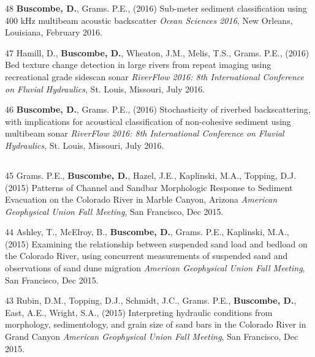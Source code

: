 \documentclass[margin,line]{resume}
\begin{document}
\begin{resume}
\begin{footnotesize}
\begin{list1}
        \item[48]{\bf Buscombe, D.}, Grams. P.E., (2016) Sub-meter sediment classification using 400 kHz multibeam acoustic backscatter {\sl Ocean Sciences 2016}, New Orleans, Louisiana, February 2016.\\
        
        \item[47] Hamill, D., {\bf Buscombe, D.}, Wheaton, J.M., Melis, T.S., Grams. P.E., (2016) Bed texture change detection in large rivers from repeat imaging using recreational grade sidescan sonar {\sl RiverFlow 2016: 8th International Conference on Fluvial Hydraulics}, St. Louis, Missouri, July 2016.\\
        
        \item[46] {\bf Buscombe, D.}, Grams. P.E., (2016) Stochasticity of riverbed backscattering, with implications for acoustical classification of non-cohesive sediment using multibeam sonar {\sl RiverFlow 2016: 8th International Conference on Fluvial Hydraulics}, St. Louis, Missouri, July 2016.

	\end{list1}
        
	\subsection{}
	\begin{list1}	

        \item[45] Grams. P.E., {\bf Buscombe, D.}, Hazel, J.E., Kaplinski, M.A., Topping, D.J. (2015) Patterns of Channel and Sandbar Morphologic Response to Sediment Evacuation on the Colorado River in Marble Canyon, Arizona {\sl American Geophysical Union Fall Meeting}, San Francisco, Dec 2015.\\

        \item[44] Ashley, T., McElroy, B., {\bf Buscombe, D.}, Grams. P.E., Kaplinski, M.A., (2015) Examining the relationship between suspended sand load and bedload on the Colorado River, using concurrent measurements of suspended sand and observations of sand dune migration {\sl American Geophysical Union Fall Meeting}, San Francisco, Dec 2015.\\

        \item[43] Rubin, D.M., Topping, D.J., Schmidt, J.C., Grams. P.E., {\bf Buscombe, D.}, East, A.E., Wright, S.A., (2015) Interpreting hydraulic conditions from morphology, sedimentology, and grain size of sand bars in the Colorado River in Grand Canyon {\sl American Geophysical Union Fall Meeting}, San Francisco, Dec 2015.\\
        

\end{list1}
\end{footnotesize}
\end{resume}
\end{document}
